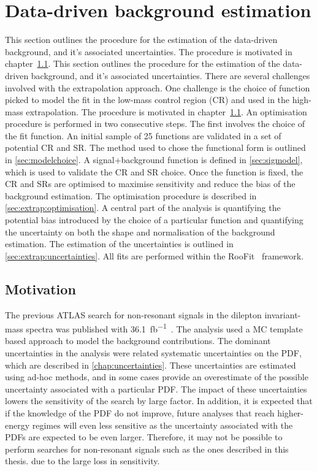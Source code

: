 \chapter{Data-driven background estimation}\label{chap:bkgmodel}
This section outlines the procedure for the estimation of the data-driven background, and it's associated uncertainties. The procedure is motivated in chapter~\cref{sec:bkgmodel:motivation}. 
This section outlines the procedure for the estimation of the data-driven background, and it's associated uncertainties. There are several challenges involved with the extrapolation approach. One challenge is the choice of function picked to model the fit in the low-mass control region (CR) and used in the high-mass extrapolation. The procedure is motivated in chapter~\cref{sec:bkgmodel:motivation}. An optimisation procedure is performed in two consecutive steps. The first involves the choice of the fit function. An initial sample of 25 functions are validated in a set of potential CR and SR. The method used to chose the functional form is outlined in \cref{sec:modelchoice}. A signal+background function is defined in \cref{sec:sigmodel}, which is used to validate the CR and SR choice. Once the function is fixed, the CR and SRs are optimised to maximise sensitivity and reduce the bias of the background estimation. The optimisation procedure is described in \cref{sec:extrap:optimisation}. A central part of the analysis is quantifying the potential bias introduced by the choice of a particular function and quantifying the uncertainty on both the shape and normalisation of the background estimation. The estimation of the uncertainties is outlined in \cref{sec:extrap:uncertainties}. All fits are performed within the RooFit~\cite{RooFit} framework.

\section{Motivation}\label{sec:bkgmodel:motivation}
The previous ATLAS search for non-resonant signals in the dilepton invariant-mass spectra was published with \SI{36.1}{\femto\barn^{-1}}~\cite{EXOT-2016-05}. The analysis used a MC template based approach to model the background contributions. The dominant uncertainties in the analysis were related systematic uncertainties on the PDF, which are described in \cref{chap:uncertainties}. These uncertainties are estimated using ad-hoc methods, and in some cases provide an overestimate of the possible uncertainty associated with a particular PDF. The impact of these uncertainties lowers the sensitivity of the search by large factor. In addition, it is expected that if the knowledge of the PDF do not improve, future analyses that reach higher-energy regimes will even less sensitive as the uncertainty associated with the PDFs are expected to be even larger. Therefore, it may not be possible to perform searches for non-resonant signals such as the ones described in this thesis. due to the large loss in sensitivity. 

